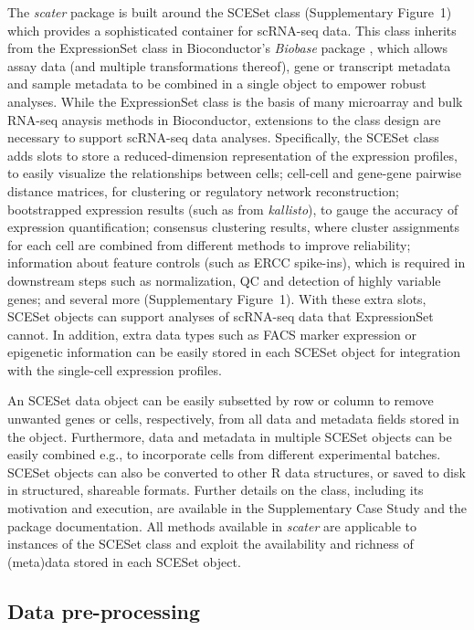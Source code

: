 \documentclass[10pt,letterpaper]{article}
\begin{document}
The \emph{scater} package is built around the SCESet class (Supplementary Figure~1) which provides a sophisticated container for scRNA-seq data. This class inherits from the ExpressionSet class in Bioconductor's \emph{Biobase} package \citep{Huber2015-en}, which allows assay data (and multiple transformations thereof), gene or transcript metadata and sample metadata to be combined in a single object to empower robust analyses. While the ExpressionSet class is the basis of many microarray and bulk RNA-seq anaysis methods in Bioconductor, extensions to the class design are necessary to support scRNA-seq data analyses. Specifically, the SCESet class adds slots to store a reduced-dimension representation of the expression profiles, to easily visualize the relationships between cells; cell-cell and gene-gene pairwise distance matrices, for clustering or regulatory network reconstruction; bootstrapped expression results (such as from \emph{kallisto}), to gauge the accuracy of expression quantification; consensus clustering results, where cluster assignments for each cell are combined from different methods to improve reliability; information about feature controls (such as ERCC spike-ins), which is required in downstream steps such as normalization, QC and detection of highly variable genes; and several more (Supplementary Figure~1). With these extra slots, SCESet objects can support analyses of scRNA-seq data that ExpressionSet cannot. In addition, extra data types such as FACS marker expression or epigenetic information can be easily stored in each SCESet object for integration with the single-cell expression profiles.

An SCESet data object can be easily subsetted by row or column to remove unwanted genes or cells, respectively, from all data and metadata fields stored in the object. Furthermore, data and metadata in multiple SCESet objects can be easily combined e.g., to incorporate cells from different experimental batches. SCESet objects can also be converted to other R data structures, or saved to disk in structured, shareable formats. Further details on the class, including its motivation and execution, are available in the Supplementary Case Study and the package documentation. All methods available in \emph{scater} are applicable to instances of the SCESet class and exploit the availability and richness of (meta)data stored in each SCESet object.


\subsection*{Data pre-processing}\label{data-pre-processing}
\end{document}
